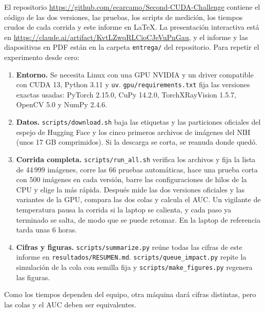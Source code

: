 \documentclass[11pt,letterpaper]{article}
\begin{document}
El repositorio \url{https://github.com/ecarcamo/Second-CUDA-Challenge} contiene el código de las dos versiones, las pruebas, los scripts de medición, los tiempos crudos de cada corrida y este informe en LaTeX. La presentación interactiva está en \url{https://claude.ai/artifact/KvtLZwqRLCioCJeVuPnGau}, y el informe y las diapositivas en PDF están en la carpeta \texttt{entrega/} del repositorio. Para repetir el experimento desde cero:

\begin{enumerate}[leftmargin=*,itemsep=1pt,topsep=2pt]
\item \textbf{Entorno.} Se necesita Linux con una GPU NVIDIA y un driver compatible con CUDA 13, Python 3.11 y \texttt{uv}. \texttt{gpu/requirements.txt} fija las versiones exactas usadas: PyTorch 2.15.0, CuPy 14.2.0, TorchXRayVision 1.5.7, OpenCV 5.0 y NumPy 2.4.6.
\item \textbf{Datos.} \texttt{scripts/download.sh} baja las etiquetas y las particiones oficiales del espejo de Hugging Face y los cinco primeros archivos de imágenes del NIH (unos 17 GB comprimidos). Si la descarga se corta, se reanuda donde quedó.
\item \textbf{Corrida completa.} \texttt{scripts/run\_all.sh} verifica los archivos y fija la lista de 44\,999 imágenes, corre las 66 pruebas automáticas, hace una prueba corta con 500 imágenes en cada versión, barre las configuraciones de hilos de la CPU y elige la más rápida. Después mide las dos versiones oficiales y las variantes de la GPU, compara las dos colas y calcula el AUC. Un vigilante de temperatura pausa la corrida si la laptop se calienta, y cada paso ya terminado se salta, de modo que se puede retomar. En la laptop de referencia tarda unas 6 horas.
\item \textbf{Cifras y figuras.} \texttt{scripts/summarize.py} reúne todas las cifras de este informe en \texttt{resultados/RESUMEN.md}. \texttt{scripts/queue\_impact.py} repite la simulación de la cola con semilla fija y \texttt{scripts/make\_figures.py} regenera las figuras.
\end{enumerate}

Como los tiempos dependen del equipo, otra máquina dará cifras distintas, pero las colas y el AUC deben ser equivalentes.

\clearpage
\end{document}
